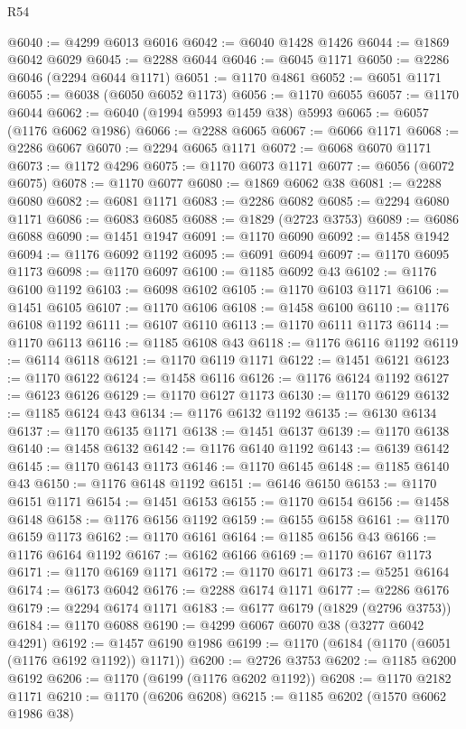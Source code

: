 \begin{lexlean}{R54}
\begin{coremodule}
@6040 := @4299 @6013 @6016
@6042 := @6040 @1428 @1426
@6044 := @1869 @6042 @6029
@6045 := @2288 @6044
@6046 := @6045 @1171
@6050 := @2286 @6046 (@2294 @6044 @1171)
@6051 := @1170 @4861
@6052 := @6051 @1171
@6055 := @6038 (@6050 @6052 @1173)
@6056 := @1170 @6055
@6057 := @1170 @6044
@6062 := @6040 (@1994 @5993 @1459 @38) @5993
@6065 := @6057 (@1176 @6062 @1986)
@6066 := @2288 @6065
@6067 := @6066 @1171
@6068 := @2286 @6067
@6070 := @2294 @6065 @1171
@6072 := @6068 @6070 @1171
@6073 := @1172 @4296
@6075 := @1170 @6073 @1171
@6077 := @6056 (@6072 @6075)
@6078 := @1170 @6077
@6080 := @1869 @6062 @38
@6081 := @2288 @6080
@6082 := @6081 @1171
@6083 := @2286 @6082
@6085 := @2294 @6080 @1171
@6086 := @6083 @6085
@6088 := @1829 (@2723 @3753)
@6089 := @6086 @6088
@6090 := @1451 @1947
@6091 := @1170 @6090
@6092 := @1458 @1942
@6094 := @1176 @6092 @1192
@6095 := @6091 @6094
@6097 := @1170 @6095 @1173
@6098 := @1170 @6097
@6100 := @1185 @6092 @43
@6102 := @1176 @6100 @1192
@6103 := @6098 @6102
@6105 := @1170 @6103 @1171
@6106 := @1451 @6105
@6107 := @1170 @6106
@6108 := @1458 @6100
@6110 := @1176 @6108 @1192
@6111 := @6107 @6110
@6113 := @1170 @6111 @1173
@6114 := @1170 @6113
@6116 := @1185 @6108 @43
@6118 := @1176 @6116 @1192
@6119 := @6114 @6118
@6121 := @1170 @6119 @1171
@6122 := @1451 @6121
@6123 := @1170 @6122
@6124 := @1458 @6116
@6126 := @1176 @6124 @1192
@6127 := @6123 @6126
@6129 := @1170 @6127 @1173
@6130 := @1170 @6129
@6132 := @1185 @6124 @43
@6134 := @1176 @6132 @1192
@6135 := @6130 @6134
@6137 := @1170 @6135 @1171
@6138 := @1451 @6137
@6139 := @1170 @6138
@6140 := @1458 @6132
@6142 := @1176 @6140 @1192
@6143 := @6139 @6142
@6145 := @1170 @6143 @1173
@6146 := @1170 @6145
@6148 := @1185 @6140 @43
@6150 := @1176 @6148 @1192
@6151 := @6146 @6150
@6153 := @1170 @6151 @1171
@6154 := @1451 @6153
@6155 := @1170 @6154
@6156 := @1458 @6148
@6158 := @1176 @6156 @1192
@6159 := @6155 @6158
@6161 := @1170 @6159 @1173
@6162 := @1170 @6161
@6164 := @1185 @6156 @43
@6166 := @1176 @6164 @1192
@6167 := @6162 @6166
@6169 := @1170 @6167 @1173
@6171 := @1170 @6169 @1171
@6172 := @1170 @6171
@6173 := @5251 @6164
@6174 := @6173 @6042
@6176 := @2288 @6174 @1171
@6177 := @2286 @6176
@6179 := @2294 @6174 @1171
@6183 := @6177 @6179 (@1829 (@2796 @3753))
@6184 := @1170 @6088
@6190 := @4299 @6067 @6070 @38 (@3277 @6042 @4291)
@6192 := @1457 @6190 @1986
@6199 := @1170 (@6184 (@1170 (@6051 (@1176 @6192 @1192)) @1171))
@6200 := @2726 @3753
@6202 := @1185 @6200 @6192
@6206 := @1170 (@6199 (@1176 @6202 @1192))
@6208 := @1170 @2182 @1171
@6210 := @1170 (@6206 @6208)
@6215 := @1185 @6202 (@1570 @6062 @1986 @38)

\end{coremodule}
\end{lexlean}
